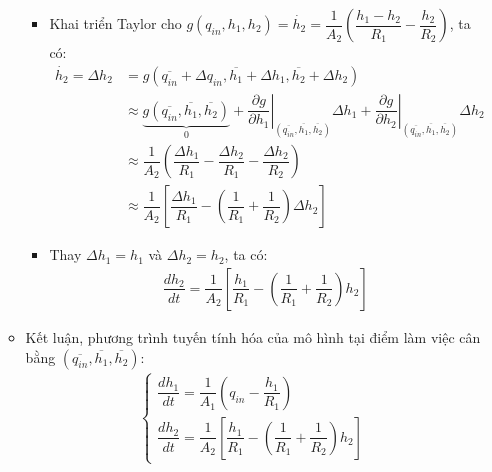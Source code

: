 \documentclass[12pt,a4paper]{article}
\begin{document}
\begin{enumerate}[\it a.]
\begin{itemize}
\begin{itemize}
                            \item Khai triển Taylor cho $g\left({q_{in}, h_1, h_2}\right) = \dot{h_2} = \dfrac{1}{A_2} \left({\dfrac{h_1 - h_2}{R_1} - \dfrac{h_2}{R_2}}\right)$, ta có:
                                \begin{align}
                                    \dot{h_2} = \Delta h_2 & = g\left({\overline{q_{in}} + \Delta q_{in}, \overline{h_1} + \Delta h_1, \overline{h_2} + \Delta h_2}\right) \\
                                    & \approx \underbrace{g\left({ \overline{q_{in}}, \overline{h_1}, \overline{h_2}}\right)}_{0} + \left.\dfrac{\partial g}{\partial h_1}\right|_{ \left({ \overline{q_{in}}, \overline{h_1}, \overline{h_2}}\right)} \Delta h_1 + \left.\dfrac{\partial g}{\partial h_2}\right|_{ \left({ \overline{q_{in}}, \overline{h_1}, \overline{h_2}}\right)} \Delta h_2\\
                                    & \approx \dfrac{1}{A_2} \left({\dfrac{\Delta h_1}{R_1} - \dfrac{\Delta h_2}{R_1} - \dfrac{\Delta h_2}{R_2}}\right)\\
                                    & \approx \dfrac{1}{A_2} \left[{\dfrac{\Delta h_1}{R_1} - \left({\dfrac{1}{R_1} + \dfrac{1}{R_2}}\right) \Delta h_2}\right]
                                \end{align}

                            \item Thay $\Delta h_1= h_1$ và $\Delta h_2 = h_2$, ta có:
                                \begin{align}
                                    \dfrac{d h_2}{dt} = \dfrac{1}{A_2} \left[{\dfrac{h_1}{R_1} - \left({\dfrac{1}{R_1} + \dfrac{1}{R_2}}\right) h_2}\right]
                                \end{align}
                        \end{itemize}

                    \item Kết luận, phương trình tuyến tính hóa của mô hình tại điểm làm việc cân bằng $\left({ \overline{q_{in}}, \overline{h_1}, \overline{h_2}}\right)$:
                        \begin{align}
                            \left\{
                            \begin{array}{l}
                                \dfrac{d h_1}{dt} = \dfrac{1}{A_1} \left({q_{in} - \dfrac{h_1}{R_1}}\right)\\ [.5cm]
                                \dfrac{d h_2}{dt} = \dfrac{1}{A_2} \left[{\dfrac{h_1}{R_1} - \left({\dfrac{1}{R_1} + \dfrac{1}{R_2}}\right) h_2}\right]
                            \end{array}
                            \right.
                        \end{align}
                \end{itemize}


\end{enumerate}
\end{document}
